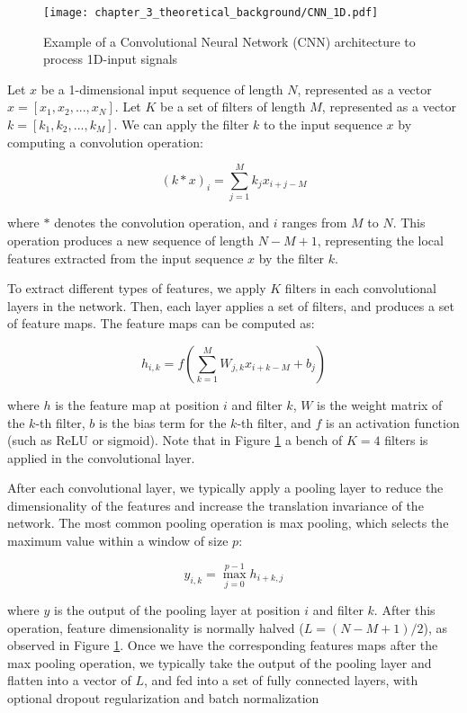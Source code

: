  \begin{figure}[h]
 	\centering
 	\texttt{[image: chapter\_3\_theoretical\_background/CNN\_1D.pdf]}
 	\caption{Example of a Convolutional Neural Network (CNN) architecture to process 1D-input signals}
 	\label{fig:chapter_3_theoretical_background/CNN_1D}
 \end{figure}
 
Let $x$ be a 1-dimensional input sequence of length $N$, represented as a vector $x = [x_1, x_2, ..., x_N]$. Let $K$ be a set of filters of length $M$, represented as a vector $k = [k_1, k_2, ..., k_M]$. We can apply the filter $k$ to the input sequence $x$ by computing a convolution operation:

\begin{equation}
	(k * x)_i = \sum_{j=1}^M k_j x_{i+j-M}
\end{equation}

where $*$ denotes the convolution operation, and $i$ ranges from $M$ to $N$. This operation produces a new sequence of length $N - M + 1$, representing the local features extracted from the input sequence $x$ by the filter $k$. 

To extract different types of features, we apply $K$ filters in each convolutional layers in the network. Then, each layer applies a set of filters, and produces a set of feature maps. The feature maps can be computed as:

\begin{equation}
	h_{i,k} = f(\sum_{k=1}^M W_{j,k} x_{i+k-M} + b_j)
\end{equation}

where $h$ is the feature map at position $i$ and filter $k$, $W$ is the weight matrix of the $k$-th filter, $b$ is the bias term for the $k$-th filter, and $f$ is an activation function (such as ReLU or sigmoid). Note that in Figure \ref{fig:chapter_3_theoretical_background/CNN_1D} a bench of $K=4$ filters is applied in the convolutional layer.

After each convolutional layer, we typically apply a pooling layer to reduce the dimensionality of the features and increase the translation invariance of the network. The most common pooling operation is max pooling, which selects the maximum value within a window of size $p$:

\begin{equation}
	y_{i,k} = \max_{j=0}^{p-1} h_{i+k,j}
\end{equation}

where $y$ is the output of the pooling layer at position $i$ and filter $k$. After this operation, feature dimensionality is normally halved ($L = (N-M+1) / 2$), as observed in Figure \ref{fig:chapter_3_theoretical_background/CNN_1D}. Once we have the corresponding features maps after the max pooling operation, we typically take the output of the pooling layer and flatten into a vector of $L$, and fed into a set of fully connected layers, with optional dropout regularization and batch normalization

